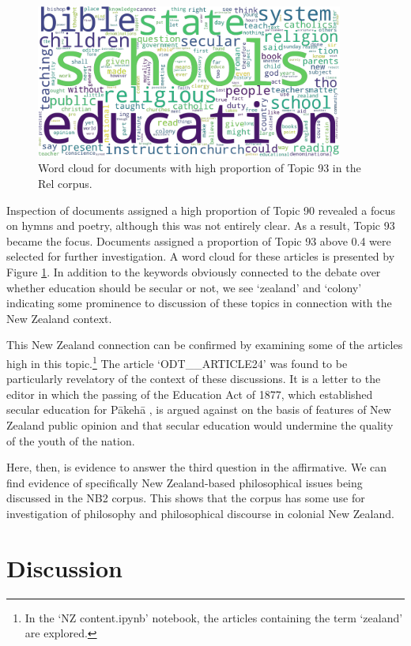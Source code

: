 \documentclass{article}
\begin{document}
\begin{figure}
  \centering
  \includegraphics[width=0.9\textwidth]{images/topic93.png}
  \caption{Word cloud for documents with high proportion of Topic 93 in the Rel corpus.}
  \label{f:wc-t93}
\end{figure}

Inspection of documents assigned a high proportion of Topic 90 revealed a focus on hymns and poetry, although this was not entirely clear. As a result, Topic 93 became the focus. Documents assigned a proportion of Topic 93 above 0.4 were selected for further investigation. A word cloud for these articles is presented by Figure \ref{f:wc-t93}. In addition to the keywords obviously connected to the debate over whether education should be secular or not, we see `zealand' and `colony' indicating some prominence to discussion of these topics in connection with the New Zealand context.

This New Zealand connection can be confirmed by examining some of the articles high in this topic.\footnote{In the `NZ content.ipynb' notebook, the articles containing the term `zealand' are explored.} The article `ODT\_\_\-ARTICLE24' was found to be particularly revelatory of the context of these discussions. It is a letter to the editor in which the passing of the Education Act of 1877, which established secular education for Pākehā \cite{education-act}, is argued against on the basis of features of New Zealand public opinion and that secular education would undermine the quality of the youth of the nation.

Here, then, is evidence to answer the third question in the affirmative. We can find evidence of specifically New Zealand-based philosophical issues being discussed in the NB2 corpus. This shows that the corpus has some use for investigation of philosophy and philosophical discourse in colonial New Zealand.

\section{Discussion}\label{s:discussion}
\end{document}
